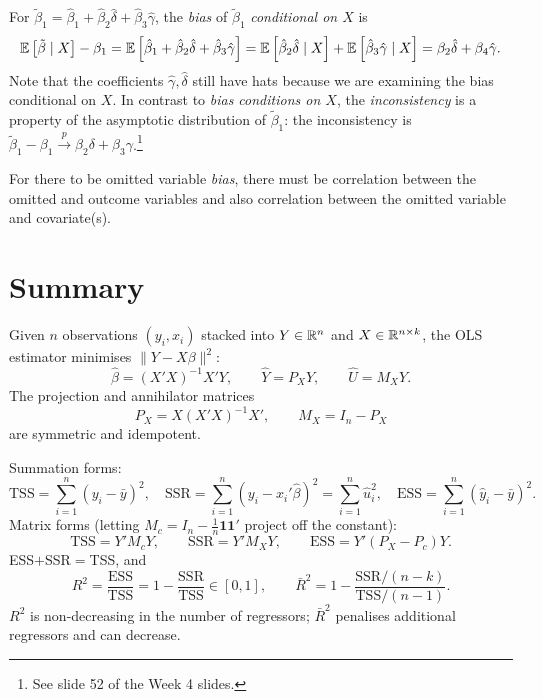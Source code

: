 For $\tilde{\beta}_1 = \hat{\beta}_1 + \hat{\beta}_2 \hat{\delta} + \hat{\beta}_3 \hat{\gamma}$, the \emph{bias} of $\tilde{\beta}_1$ \emph{conditional on $X$} is \[\mathbb{E}\left[\tilde{\beta} \mid X\right] - \beta_1 = \mathbb{E}\left[\hat{\beta}_1 + \hat{\beta}_2 \hat{\delta} + \hat{\beta}_3 \hat{\gamma}\right] = \mathbb{E}\left[\hat{\beta}_2 \hat{\delta} \mid X\right]  + \mathbb{E}\left[\hat{\beta}_3 \hat{\gamma} \mid X\right] = \beta_2 \hat{\delta} + \beta_4 \hat{\gamma}.\] Note that the coefficients $\hat{\gamma}, \hat{\delta}$ still have hats because we are examining the bias conditional on $X$. In contrast to \emph{bias conditions on $X$}, the \emph{inconsistency} is a property of the asymptotic distribution of $\tilde{\beta}_1$: the inconsistency is $\tilde{\beta}_1 - \beta_1 \xrightarrow{p} \beta_2 \delta + \beta_3 \gamma$.\footnote{See slide 52 of the Week 4 slides.}

For there to be omitted variable \emph{bias}, there must be correlation between the omitted and outcome variables and also correlation between the omitted variable and covariate(s).

\section{Summary}

\begin{remark}
	Given $n$ observations $(y_i,x_i)$ stacked into $Y\in\mathbb{R}^n$ and $X\in\mathbb{R}^{n\times k}$, the OLS estimator minimises $\|Y-X\beta\|^2$:
	\[
		\hat\beta=(X'X)^{-1}X'Y,\qquad \hat Y=P_X Y,\qquad \hat U=M_X Y.
	\]
	The projection and annihilator matrices\[P_X=X(X'X)^{-1}X',\qquad M_X=I_n-P_X\]are symmetric and idempotent.
\end{remark}

\begin{remark}
	Summation forms:
	\[
		\text{TSS}=\sum_{i=1}^n(y_i-\bar y)^2,\quad
		\text{SSR}=\sum_{i=1}^n(y_i-x_i'\hat\beta)^2=\sum_{i=1}^n\hat u_i^2,\quad
		\text{ESS}=\sum_{i=1}^n(\hat y_i-\bar y)^2.
	\]
	Matrix forms (letting $M_c=I_n-\tfrac{1}{n}\mathbf{1}\mathbf{1}'$ project off the constant):
	\[
		\text{TSS}=Y'M_cY,\qquad\text{SSR}=Y'M_XY,\qquad\text{ESS}=Y'(P_X-P_c)Y.
	\]
	ESS$+$SSR$=$TSS, and
	\[
		R^2=\frac{\text{ESS}}{\text{TSS}}=1-\frac{\text{SSR}}{\text{TSS}}\in[0,1],\qquad
		\bar R^2=1-\frac{\text{SSR}/(n-k)}{\text{TSS}/(n-1)}.
	\]
	$R^2$ is non-decreasing in the number of regressors; $\bar R^2$ penalises additional regressors and can decrease.
\end{remark}

